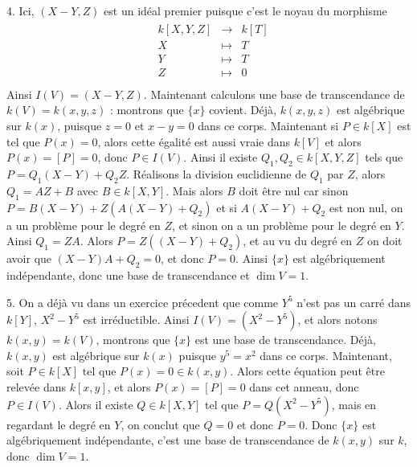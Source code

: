         \begin{question}{4.}
            Ici, $(X - Y, Z)$ est un idéal premier puisque c'est le noyau du morphisme
            \begin{align*}
                \begin{array}{cccc}
                    & k[X,Y,Z] & \to & k[T] \\
                    & X & \mapsto & T \\
                    & Y & \mapsto & T \\
                    & Z & \mapsto & 0 \\
                \end{array}
            \end{align*}
            Ainsi $I(V) = (X - Y, Z)$. Maintenant calculons une base de transcendance de $k(V) = k(x,y,z)$ : montrons que $\{x\}$ covient. Déjà, $k(x,y,z)$ est algébrique sur $k(x)$, puisque $z = 0$ et $x - y = 0$ dans ce corps. Maintenant si $P \in k[X]$ est tel que $P(x) = 0$, alors cette égalité est aussi vraie dans $k[V]$ et alors $P(x) = [P] = 0$, donc $P \in I(V)$. Ainsi il existe $Q_1, Q_2 \in k[X,Y,Z]$ tels que $P = Q_1(X - Y) + Q_2Z$. Réalisons la division euclidienne de $Q_1$ par $Z$, alors $Q_1 = AZ + B$ avec $B \in k[X,Y]$. Mais alors $B$ doit être nul car sinon $P = B(X - Y) + Z(A(X - Y) + Q_2)$ et si $A(X - Y) + Q_2$ est non nul, on a un problème pour le degré en $Z$, et sinon on a un problème pour le degré en $Y$. Ainsi $Q_1 = ZA$. Alors $P = Z((X - Y) + Q_2)$, et au vu du degré en $Z$ on doit avoir que $(X - Y)A + Q_2 = 0$, et donc $P = 0$. Ainsi $\{x\}$ est algébriquement indépendante, donc une base de transcendance et $\dim V = 1$.
        \end{question}
        \begin{question}{5.}
            On a déjà vu dans un exercice précedent que comme $Y^5$ n'est pas un carré dans $k[Y]$, $X^2 - Y^5$ est irréductible. Ainsi $I(V) = (X^2 - Y^5)$, et alors notons $k(x,y) = k(V)$, montrons que $\{x\}$ est une base de transcendance. Déjà, $k(x,y)$ est algébrique sur $k(x)$ puisque $y^5 = x^2$ dans ce corps. Maintenant, soit $P \in k[X]$ tel que $P(x) = 0 \in k(x,y)$. Alors cette équation peut être relevée dans $k[x,y]$, et alors $P(x) = [P] = 0$ dans cet anneau, donc $P \in I(V)$. Alors il existe $Q \in k[X,Y]$ tel que $P = Q(X^2 - Y^5)$, mais en regardant le degré en $Y$, on conclut que $Q = 0$ et donc $P = 0$. Donc $\{x\}$ est algébriquement indépendante, c'est une base de transcendance de $k(x,y)$ sur $k$, donc $\dim V = 1$.
        \end{question}

